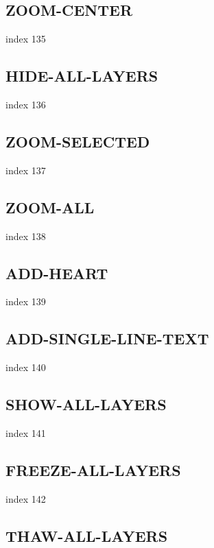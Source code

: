 \documentclass[a4paper]{report}
\begin{document}
\subsection{ZOOM-CENTER}

index 135

\subsection{HIDE-ALL-LAYERS}

index 136

\subsection{ZOOM-SELECTED}

index 137

\subsection{ZOOM-ALL}

index 138

\subsection{ADD-HEART}

index 139

\subsection{ADD-SINGLE-LINE-TEXT}

index 140

\subsection{SHOW-ALL-LAYERS}

index 141

\subsection{FREEZE-ALL-LAYERS}

index 142

\subsection{THAW-ALL-LAYERS}
\end{document}
